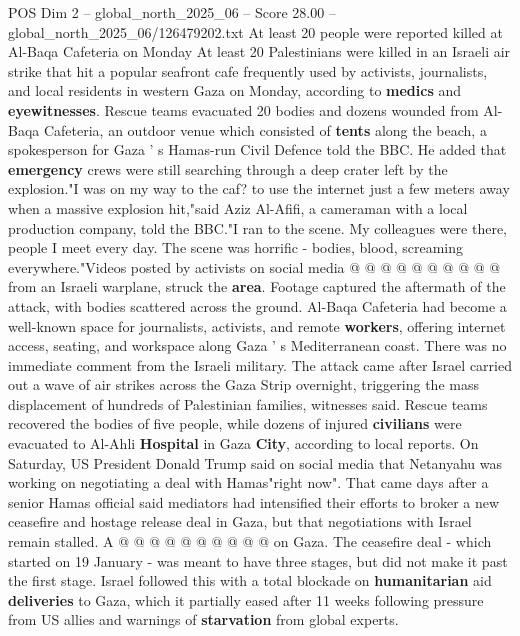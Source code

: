 \begin{textsample}{POS Dim 2 – global\_north\_2025\_06 – Score 28.00 – global\_north\_2025\_06/126479202.txt}  \label{ex:f2_pos_224}
At least 20 people were reported killed at Al-Baqa Cafeteria on Monday At least 20 Palestinians were killed in an Israeli air strike that hit a popular seafront cafe frequently used by activists, journalists, and local residents in western Gaza on Monday, according to \textbf{medics} and \textbf{eyewitnesses}.
Rescue teams evacuated 20 bodies and dozens wounded from Al-Baqa Cafeteria, an outdoor venue which consisted of \textbf{tents} along the beach, a spokesperson for Gaza ' s Hamas-run Civil Defence told the BBC.
He added that \textbf{emergency} crews were still searching through a deep crater left by the explosion."I was on my way to the caf? to use the internet just a few meters away when a massive explosion hit,"said Aziz Al-Afifi, a cameraman with a local production company, told the BBC."I ran to the scene.
My colleagues were there, people I meet every day.
The scene was horrific - bodies, blood, screaming everywhere."Videos posted by activists on social media @ @ @ @ @ @ @ @ @ @ from an Israeli warplane, struck the \textbf{area}.
Footage captured the aftermath of the attack, with bodies scattered across the ground.
Al-Baqa Cafeteria had become a well-known space for journalists, activists, and remote \textbf{workers}, offering internet access, seating, and workspace along Gaza ' s Mediterranean coast.
There was no immediate comment from the Israeli military.
The attack came after Israel carried out a wave of air strikes across the Gaza Strip overnight, triggering the mass displacement of hundreds of Palestinian families, witnesses said.
Rescue teams recovered the bodies of five people, while dozens of injured \textbf{civilians} were evacuated to Al-Ahli \textbf{Hospital} in Gaza \textbf{City}, according to local reports.
On Saturday, US President Donald Trump said on social media that Netanyahu was working on negotiating a deal with Hamas"right now".
That came days after a senior Hamas official said mediators had intensified their efforts to broker a new ceasefire and hostage release deal in Gaza, but that negotiations with Israel remain stalled.
A @ @ @ @ @ @ @ @ @ @ on Gaza.
The ceasefire deal - which started on 19 January - was meant to have three stages, but did not make it past the first stage.
Israel followed this with a total blockade on \textbf{humanitarian} aid \textbf{deliveries} to Gaza, which it partially eased after 11 weeks following pressure from US allies and warnings of \textbf{starvation} from global experts.

\end{textsample}
